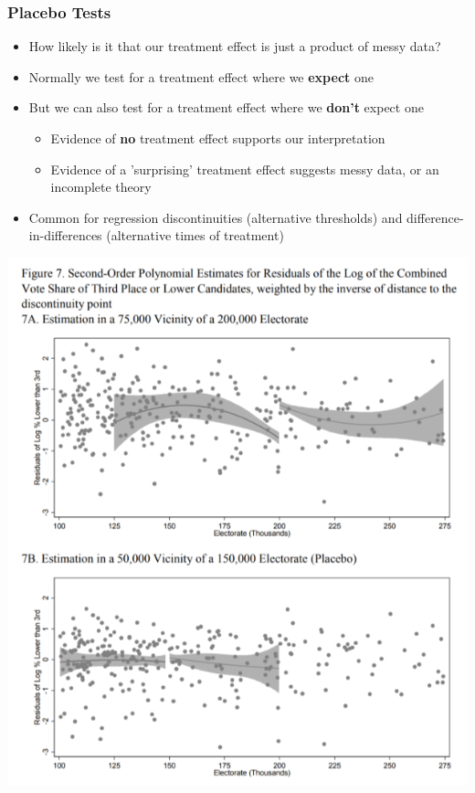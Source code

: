 \documentclass[xcolor=x11names,compress]{beamer}\usepackage[]{graphicx}\usepackage[]{color}
\renewcommand{\(}{\begin{columns}}
\renewcommand{\)}{\end{columns}}
\newcommand{\<}[1]{\begin{column}{#1}}
\renewcommand{\>}{\end{column}}
\begin{document}
\begin{frame}
\frametitle{Placebo Tests}
\begin{itemize}
\item How likely is it that our treatment effect is just a product of messy data?
\pause
\item Normally we test for a treatment effect where we \textbf{expect} one
\pause
\item But we can also test for a treatment effect where we \textbf{don't} expect one
\begin{itemize}
\item Evidence of \textbf{no} treatment effect supports our interpretation
\pause
\item Evidence of a 'surprising' treatment effect suggests messy data, or an incomplete theory
\end{itemize}
\pause
\item Common for regression discontinuities (alternative thresholds) and difference-in-differences (alternative times of treatment)
\end{itemize}
\end{frame}

\begin{frame}
\includegraphics[scale=0.5]{placebo_2.png}
\end{frame}
\end{document}
